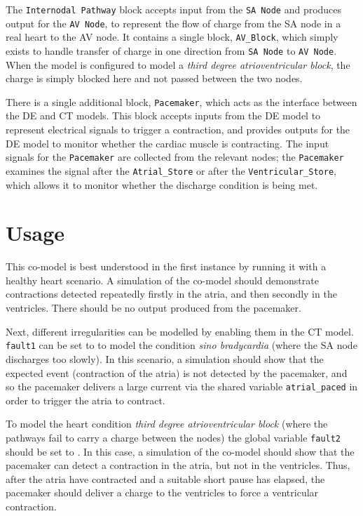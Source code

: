 The \texttt{Internodal Pathway} block accepts input from the
\texttt{SA Node} and produces output for the \texttt{AV Node}, to
represent the flow of charge from the SA node in a real heart to the
AV node.  It contains a single block, \texttt{AV\_Block}, which simply
exists to handle transfer of charge in one direction from \texttt{SA
  Node} to \texttt{AV Node}.  When the model is configured to model a
\emph{third degree atrioventricular block}, the charge is simply
blocked here and not passed between the two nodes.

There is a single additional block, \texttt{Pacemaker}, which acts as
the interface between the DE and CT models.  This block accepts inputs
from the DE model to represent electrical signals to trigger a
contraction, and provides outputs for the DE model to monitor whether
the cardiac muscle is contracting.  The input signals for the
\texttt{Pacemaker} are collected from the relevant nodes; the
\texttt{Pacemaker} examines the signal after the
\texttt{Atrial\_Store} or after the \texttt{Ventricular\_Store}, which
allows it to monitor whether the discharge condition is being met.


\section{Usage}
This co-model is best understood in the first instance by running it
with a healthy heart scenario.  A simulation of the co-model should
demonstrate contractions detected repeatedly firstly in the atria, and
then secondly in the ventricles.  There should be no output produced
from the pacemaker.

Next, different irregularities can be modelled by enabling them in the
CT model.  \texttt{fault1} can be set to {\textbf{}} to
model the condition \emph{sino bradycardia} (where the SA node
discharges too slowly).  In this scenario, a simulation should show
that the expected event (contraction of the atria) is not detected by
the pacemaker, and so the pacemaker delivers a large current via the
shared variable \texttt{atrial\_paced} in order to trigger the atria
to contract.

To model the heart condition \emph{third degree atrioventricular
  block} (where the pathways fail to carry a charge between the nodes)
the global variable \texttt{fault2} should be set to
{\textbf{}}.  In this case, a simulation of the co-model
should show that the pacemaker can detect a contraction in the atria,
but not in the ventricles.  Thus, after the atria have contracted and
a suitable short pause has elapsed, the pacemaker should deliver a
charge to the ventricles to force a ventricular contraction.
